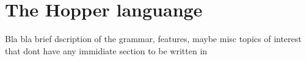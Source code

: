 \section{The Hopper languange}

Bla bla brief dscription of the grammar, features, maybe misc topics of interest
that dont have any immidiate section to be written in
